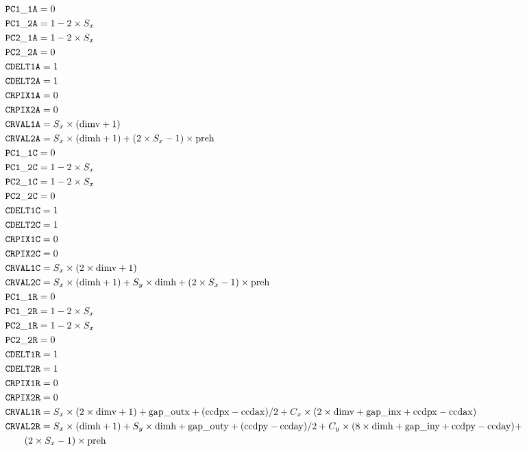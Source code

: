 \documentclass{article}[12pt]
\begin{document}
{\begin{align*}
& {\tt PC1\_1A} = 0 \\
& {\tt PC1\_2A} = 1 - 2 \times S_x \\
& {\tt PC2\_1A} = 1 - 2 \times S_x \\
& {\tt PC2\_2A} = 0 \\
& {\tt CDELT1A} = 1 \\
& {\tt CDELT2A} = 1 \\
& {\tt CRPIX1A} = 0 \\
& {\tt CRPIX2A} = 0 \\
& {\tt CRVAL1A }= S_x \times ({\rm dimv} + 1) \\
& {\tt CRVAL2A} = S_x \times ({\rm dimh} + 1) + (2 \times S_x - 1) \times {\rm preh} \\
& {\tt PC1\_1C} = 0  \\
& {\tt PC1\_2C} = 1 - 2 \times S_x \\
& {\tt PC2\_1C} = 1 - 2 \times S_x \\
& {\tt PC2\_2C} = 0 \\
& {\tt CDELT1C} = 1 \\
& {\tt CDELT2C} = 1 \\
& {\tt CRPIX1C} = 0 \\
& {\tt CRPIX2C} = 0 \\
& {\tt CRVAL1C} = S_x \times (2 \times {\rm dimv} + 1) \\
& {\tt CRVAL2C} = S_x \times ({\rm dimh} + 1) + S_y \times {\rm dimh}  + (2 \times S_x - 1) \times {\rm preh}  \\
& {\tt PC1\_1R} = 0  \\
& {\tt PC1\_2R} = 1 - 2 \times S_x \\
& {\tt PC2\_1R} = 1 - 2 \times S_x \\
& {\tt PC2\_2R} = 0 \\
& {\tt CDELT1R} = 1 \\
& {\tt CDELT2R} = 1 \\
& {\tt CRPIX1R} = 0 \\
& {\tt CRPIX2R} = 0 \\
& {\tt CRVAL1R} = S_x \times (2 \times {\rm dimv} + 1) + {\rm gap\_outx} + ({\rm ccdpx} - {\rm ccdax})/2 + C_x \times (2 \times {\rm dimv} + {\rm gap\_inx} + {\rm ccdpx} - {\rm ccdax}) \\
& {\tt CRVAL2R} = S_x \times ({\rm dimh} + 1) + S_y \times {\rm dimh} +  {\rm gap\_outy} + ({\rm ccdpy} - {\rm ccday})/2 + C_y \times ( 8 \times {\rm dimh} + {\rm gap\_iny} + {\rm ccdpy} - {\rm ccday}) +  \\  &\qquad {} (2 \times S_x - 1) \times {\rm preh} \\

\end{align*}}
\end{document}
